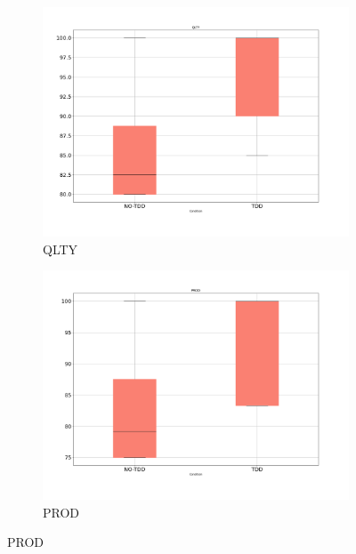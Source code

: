 \begin{figure}[htbp]
    \centering
    \begin{subfigure}{0.5\textwidth}
        \includegraphics[width=\linewidth]{figures/box_plots/task3/QLTY.png}
        \caption{QLTY}
        \label{bp_task3_qlty}
    \end{subfigure}\hfil
    \begin{subfigure}{0.5\textwidth}
        \includegraphics[width=\linewidth]{figures/box_plots/task3/PROD.png}
        \caption{PROD}
        \label{bp_task3_prod}
    \end{subfigure}

    \medskip


\end{figure}

